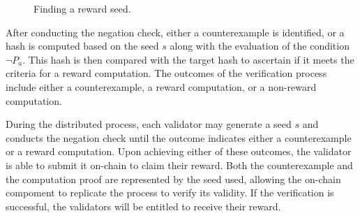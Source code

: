 \documentclass[runningheads]{llncs}
\begin{document}
\begin{figure}
    \centering
{}
\caption{Finding a reward seed.}
\label{fig:find_seed}
\end{figure}


After conducting the negation check, either a counterexample is identified, or a hash is computed based on the seed $s$ along with the evaluation of the condition $\neg P_{a}$. This hash is then compared with the target hash to ascertain if it meets the criteria for a reward computation. The outcomes of the verification process include either a counterexample, a reward computation, or a non-reward computation.

During the distributed process, each validator may generate a seed $s$ and conducts the negation check until the outcome indicates either a counterexample or a reward computation. Upon achieving either of these outcomes, the validator is able to submit it on-chain to claim their reward. Both the counterexample and the computation proof are represented by the seed used, allowing the on-chain compoment to replicate the process to verify its validity. If the verification is successful, the validators will be entitled to receive their reward.
 
\end{document}
